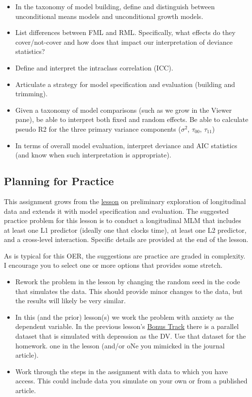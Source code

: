 \documentclass[
  english,
]{book}
\providecommand{\tightlist}{%
  \setlength{\itemsep}{0pt}\setlength{\parskip}{0pt}}
\begin{document}
\begin{itemize}
\tightlist
\item
  In the taxonomy of model building, define and distinguish between unconditional means models and unconditional growth models.
\item
  List differences between FML and RML. Specifically, what effects do they cover/not-cover and how does that impact our interpretation of deviance statistics?
\item
  Define and interpret the intraclass correlation (ICC).
\item
  Articulate a strategy for model specification and evaluation (building and trimming).
\item
  Given a taxonomy of model comparisons (such as we grow in the Viewer pane), be able to interpret both fixed and random effects. Be able to calculate pseudo R2 for the three primary variance components (\(\sigma^2\), \(\tau _{00}\), \(\tau _{11}\))
\item
  In terms of overall model evaluation, interpret deviance and AIC statistics (and know when such interpretation is appropriate).
\end{itemize}

\hypertarget{planning-for-practice-2}{%
\subsection{Planning for Practice}\label{planning-for-practice-2}}

This assignment grows from the \protect\hyperlink{MLMexplore}{lesson} on preliminary exploration of longitudinal data and extends it with model specification and evaluation. The suggested practice problem for this lesson is to conduct a longitudinal MLM that includes at least one L1 predictor (ideally one that clocks time), at least one L2 predictor, and a cross-level interaction. Specific details are provided at the end of the lesson.

As is typical for this OER, the suggestions are practice are graded in complexity. I encourage you to select one or more options that provides some stretch.

\begin{itemize}
\tightlist
\item
  Rework the problem in the lesson by changing the random seed in the code that simulates the data. This should provide minor changes to the data, but the results will likely be very similar.
\item
  In this (and the prior) lesson(s) we work the problem with anxiety as the dependent variable. In the previous lesson's \protect\hyperlink{MLMexplore}{Bonus Track} there is a parallel dataset that is simulated with depression as the DV. Use that dataset for the homework. one in the lesson (and/or oNe you mimicked in the journal article).
\item
  Work through the steps in the assignment with data to which you have access. This could include data you simulate on your own or from a published article.
\end{itemize}
\end{document}
